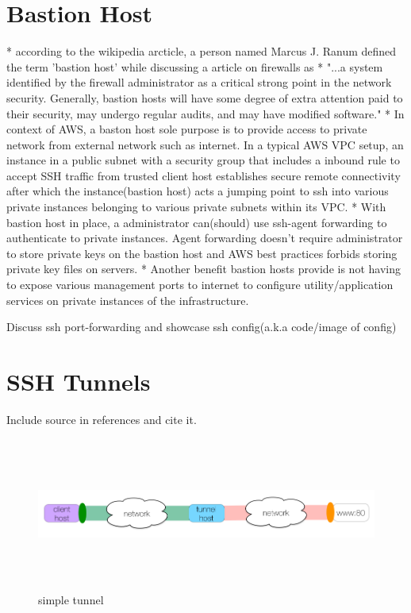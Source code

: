 \section{Bastion Host}
* according to the wikipedia arcticle, a person named Marcus J. Ranum defined the term 'bastion host' while discussing a article on firewalls as 
    * "...a system identified by the firewall administrator as a critical strong point in the network security. Generally, bastion hosts will have some degree of extra attention paid to their security, may undergo regular audits, and may have modified software."
* In context of AWS, a baston host sole purpose is to provide access to private network from external network such as internet. In a typical AWS VPC setup, an instance in a public subnet with a security group that includes a inbound rule to accept SSH traffic from trusted client host establishes secure remote connectivity after which the instance(bastion host) acts a jumping point to ssh into various private instances belonging to various private subnets within its VPC. 
* With bastion host in place, a administrator can(should) use ssh-agent forwarding to authenticate to private instances. Agent forwarding doesn't require administrator to store private keys on the bastion host and AWS best practices forbids storing private key files on servers.
* Another benefit bastion hosts provide is not having to expose various management ports to internet to configure utility/application services on private instances of the infrastructure.

Discuss ssh port-forwarding and showcase ssh config(a.k.a code/image of config)

\pagebreak

\section{SSH Tunnels}
Include source in references and cite it.
\begin{figure}[h!]
  \centering
  \includegraphics[width=15cm,height=5cm,keepaspectratio]{../media/crawler/simple-tunnel.png}
  \caption{simple tunnel}
  \label{fig:simpletunnel}
\end{figure}

